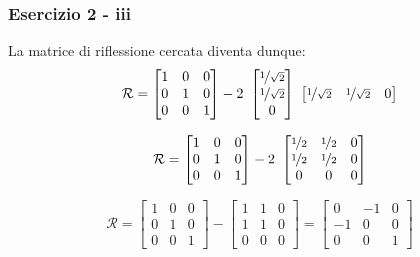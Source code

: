 \documentclass{beamer}
\begin{document}
\begin{frame}
\frametitle{ Esercizio 2 - iii}
La matrice di riflessione cercata diventa dunque:
\begin{displaymath}
\mathcal{R} =  \begin{bmatrix}
                1 & 0 & 0\\
                0  & 1 & 0\\
                0 & 0 & 1
                \end{bmatrix}
    -2~\begin{bmatrix}
    \nicefrac{1}{\sqrt{2}} \\
    \nicefrac{1}{\sqrt{2}} \\
    0
    \end{bmatrix} 
    ~\begin{bmatrix}
    \nicefrac{1}{\sqrt{2}} & \nicefrac{1}{\sqrt{2}} & 0
    \end{bmatrix}
\end{displaymath}

\begin{displaymath}
\mathcal{R} =  \begin{bmatrix}
                1 & 0 & 0\\
                0  & 1 & 0\\
                0 & 0 & 1
                \end{bmatrix}
    -2~\begin{bmatrix}
                \nicefrac{1}{2} & \nicefrac{1}{2}  & 0\\
                \nicefrac{1}{2} & \nicefrac{1}{2}  & 0\\
                0 & 0 & 0
                \end{bmatrix}
\end{displaymath}

\begin{displaymath}
\mathcal{R} =  \begin{bmatrix}
                1 & 0 & 0\\
                0  & 1 & 0\\
                0 & 0 & 1
                \end{bmatrix}
    -\begin{bmatrix}
                1 & 1 & 0\\
                1 & 1 & 0\\
                0 & 0 & 0
                \end{bmatrix}
 =  \begin{bmatrix}
                0 & -1 & 0\\
                -1 & 0 & 0\\
                0 & 0 & 1
                \end{bmatrix}
\end{displaymath}
\end{frame}
\end{document}
